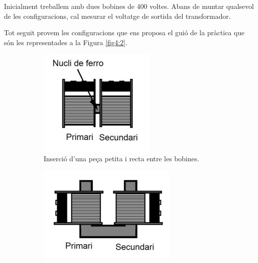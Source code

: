 \documentclass[a4paper,10.5pt]{report}
\begin{document}
Inicialment treballem amb dues bobines de 400 voltes. Abans de muntar qualsevol de les configuracions, cal mesurar el voltatge de sortida del transformador.

Tot seguit provem les configuracions que ens proposa el guió de la pràctica que són les representades a la Figura \ref{fig4:2}.

\begin{figure}[h]
	\centering
	\begin{subfigure}[b]{0.3\textwidth}
		\centering
		\includegraphics[width=\textwidth]{42a.jpg}
		\caption{Inserció d'una peça petita i recta entre les bobines.}
		\label{fig4:2a}
	\end{subfigure}
	\hspace{0.5cm}
	\begin{subfigure}[b]{0.3\textwidth}
		\centering
		\includegraphics[width=\textwidth]{42b.jpg}

\end{subfigure}
\end{figure}
\end{document}
